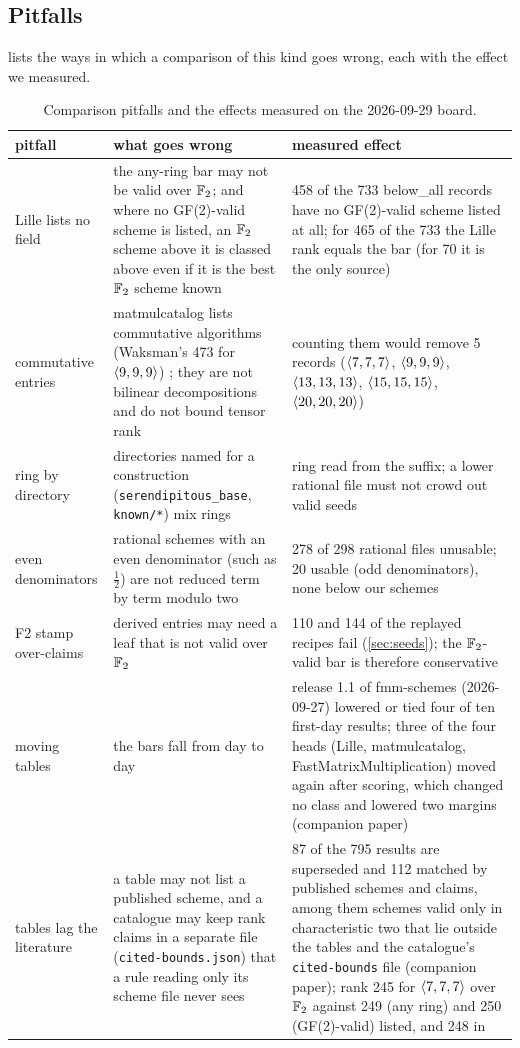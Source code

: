 \subsection{Pitfalls}
 lists the ways in which a comparison of this kind goes wrong, each with the effect we measured.
\begin{table}[t]
\centering\small
\begin{tabular}{@{}p{3.3cm}p{5.0cm}p{5.5cm}@{}}
\toprule
pitfall & what goes wrong & measured effect\\
\midrule
Lille lists no field & the any-ring bar may not be valid over ${\mathbb{F}_2}$; and where no GF(2)-valid scheme is listed, an ${\mathbb{F}_2}$ scheme above it is classed \textsf{above} even if it is the best ${\mathbb{F}_2}$ scheme known & 458 of the 733 \textsf{below\_all} records have no GF(2)-valid scheme listed at all; for 465 of the 733 the Lille rank equals the bar (for 70 it is the only source)\\
commutative entries & matmulcatalog lists commutative algorithms (Waksman's 473 for $\langle 9,9,9\rangle$) \cite{waksman1970winograd,winograd1968inner}; they are not bilinear decompositions and do not bound tensor rank & counting them would remove 5 records ($\langle 7,7,7\rangle$, $\langle 9,9,9\rangle$, $\langle 13,13,13\rangle$, $\langle 15,15,15\rangle$, $\langle 20,20,20\rangle$)\\
ring by directory & directories named for a construction (\texttt{serendipitous\_base}, \texttt{known/*}) mix rings & ring read from the suffix; a lower rational file must not crowd out valid seeds\\
even denominators & rational schemes with an even denominator (such as $\tfrac12$) are not reduced term by term modulo two & 278 of 298 rational files unusable; 20 usable (odd denominators), none below our schemes\\
F2 stamp over-claims & derived entries may need a leaf that is not valid over ${\mathbb{F}_2}$ & 110 and 144 of the replayed recipes fail (\cref{sec:seeds}); the ${\mathbb{F}_2}$-valid bar is therefore conservative\\
moving tables & the bars fall from day to day & release 1.1 of fmm-schemes (2026-09-27) lowered or tied four of ten first-day results; three of the four heads (Lille, matmulcatalog, FastMatrixMultiplication) moved again after scoring, which changed no class and lowered two margins (companion paper)\\
tables lag the literature & a table may not list a published scheme, and a catalogue may keep rank claims in a separate file (\texttt{cited-bounds.json}) that a rule reading only its scheme file never sees & 87 of the 795 results are superseded and 112 matched by published schemes and claims, among them schemes valid only in characteristic two that lie outside the tables and the catalogue's \texttt{cited-bounds} file (companion paper); rank 245 for $\langle 7,7,7\rangle$ over ${\mathbb{F}_2}$ \cite{medley2026gpu} against 249 (any ring) and 250 (GF(2)-valid) listed, and 248 in \cite{perminov2025ternary}\\
\bottomrule
\end{tabular}
\caption{Comparison pitfalls and the effects measured on the 2026-09-29 board.}
\label{tab:pitfalls}
\end{table}

